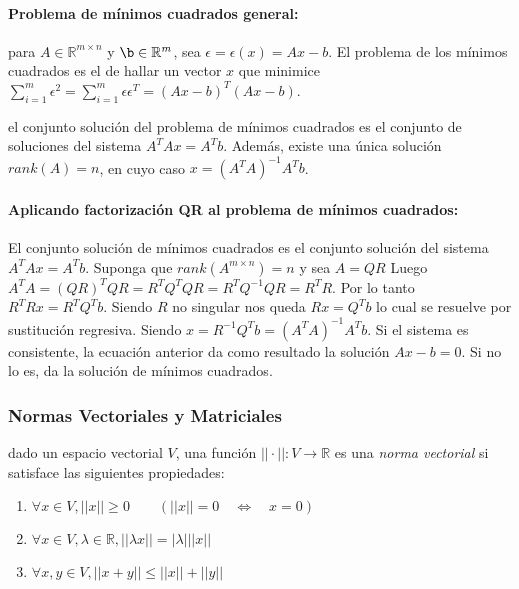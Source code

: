 \hypertarget{problema-de-muxednimos-cuadrados-general}{%
\paragraph{Problema de mínimos cuadrados
general:}\label{problema-de-muxednimos-cuadrados-general}}

para \(A \in \ensuremath{\mathbb{R}}^{m \times n}\) y
\(\b \in \ensuremath{\mathbb{R}}^m\), sea
\(\epsilon = \epsilon(x) = A x - b\). El problema de los mínimos
cuadrados es el de hallar un vector \(x\) que minimice
\(\sum_{i=1}^m \epsilon^2 = \sum_{i=1}^m \epsilon \epsilon^T = (Ax - b)^T (Ax - b)\).

\Teorema el conjunto solución del problema de mínimos cuadrados es el
conjunto de soluciones del sistema \(A^T Ax = A^T b\). Además, existe
una única solución \sii \(rank(A) = n\), en cuyo caso
\(x = (A^T A)^{-1}A^T b\).

\hypertarget{aplicando-factorizaciuxf3n-qr-al-problema-de-muxednimos-cuadrados}{%
\paragraph{Aplicando factorización QR al problema de mínimos
cuadrados:}\label{aplicando-factorizaciuxf3n-qr-al-problema-de-muxednimos-cuadrados}}

El conjunto solución de mínimos cuadrados es el conjunto solución del
sistema \(A^T Ax = A^T b\). Suponga que \(rank(A^{m \times n}) = n\) y
sea \(A = QR\) Luego
\(A^T A = (QR)^T QR = R^T Q^T Q R = R^T Q^{-1} Q R = R^T R\). Por lo
tanto \(R^T Rx = R^T Q^T b\). Siendo \(R\) no singular nos queda
\(Rx = Q^T b\) lo cual se resuelve por sustitución regresiva. Siendo
\(x = R^{-1} Q^T b = (A^T A)^{-1} A^T b\). Si el sistema es consistente,
la ecuación anterior da como resultado la solución \(Ax - b = 0\). Si no
lo es, da la solución de mínimos cuadrados.

\hypertarget{normas-vectoriales-y-matriciales}{%
\subsubsection{Normas Vectoriales y
Matriciales}\label{normas-vectoriales-y-matriciales}}

\Definicion dado un espacio vectorial \(V\), una función
\(||\cdot|| : V \rightarrow \ensuremath{\mathbb{R}}\) es una \emph{norma
vectorial} si satisface las siguientes propiedades:

\begin{enumerate}
\def\labelenumi{\arabic{enumi}.}
\tightlist
\item
  \(\forall x \in V, ||x|| \geq 0 \qquad (||x|| = 0 \ensuremath{\quad\Longleftrightarrow\quad}x = 0)\)
\item
  \(\forall x \in V, \lambda \in \ensuremath{\mathbb{R}}, ||\lambda x|| = |\lambda| ||x||\)
\item
  \(\forall x,y \in V, ||x+y|| \leq ||x|| + ||y||\)
\end{enumerate}

